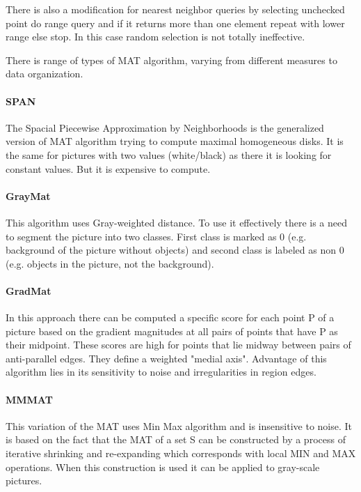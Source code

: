 There is also a modification for nearest neighbor queries by selecting unchecked point do range query and if it returns more than one element repeat with lower range else stop. In this case random selection is not totally ineffective.

There is range of types of MAT algorithm, varying from different measures to data organization.
\paragraph{SPAN}
The Spacial Piecewise Approximation by Neighborhoods is the generalized version of MAT algorithm trying to compute maximal homogeneous disks. It is the same for pictures with two values (white/black) as there it is looking for constant values. But it is expensive to compute.
\paragraph{GrayMat}
This algorithm uses Gray-weighted distance. To use it effectively there is a need to segment the picture into two classes. First class is marked as 0 (e.g. background of the picture without objects) and second class is labeled as non 0 (e.g. objects in the picture, not the background).
\paragraph{GradMat}
In this approach there can be computed a specific score for each point P of a picture based on the gradient magnitudes at all pairs of points that have P as their midpoint. These scores are high for points that lie midway between pairs of anti-parallel edges. They define a weighted "medial axis". 
Advantage of this algorithm lies in its sensitivity to noise and irregularities in region edges.
\paragraph{MMMAT}
This variation of the MAT uses Min Max algorithm and is insensitive to noise. It is based on the fact that the MAT of a set S can be constructed by a process of iterative shrinking and re-expanding which corresponds with local MIN and MAX operations. When this construction is used it can be applied to gray-scale pictures. \cite{MMMAT}
